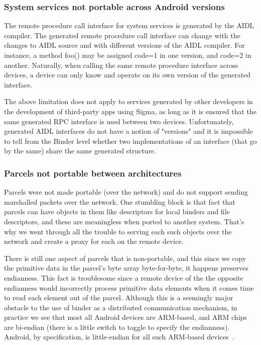 \documentclass[prodmode]{acmlarge}
\begin{document}
\subsubsection{System services not portable across Android versions}
The remote procedure call interface for system services is generated by the AIDL compiler. The generated remote procedure call interface can change with the changes to AIDL source and with different versions of the AIDL compiler. For instance, a method foo() may be assigned code=1 in one version, and code=2 in another. Naturally, when calling the same remote procedure interface across devices, a device can only know and operate on its own version of the generated interface.

The above limitation does not apply to services generated by other developers in the development of third-party apps using Sigma, as long as it is ensured that the same generated RPC interface is used between two devices. Unfortunately, generated AIDL interfaces do not have a notion of "versions" and it is impossible to tell from the Binder level whether two implementations of an interface (that go by the same) share the same generated structure.

\subsubsection{Parcels not portable between architectures}
Parcels were not made portable (over the network) and do not support sending marshalled packets over the network. One stumbling block is that fact that parcels can have objects in them like descriptors for local binders and file descriptors, and these are meaningless when ported to another system. That's why we went through all the trouble to serving each such objects over the network and create a proxy for each on the remote device.

There is still one aspect of parcels that is non-portable, and this since we copy the primitive data in the parcel's byte array byte-for-byte, it happens preserves endianness. This fact is troublesome since a remote device of the the opposite endianness would incorrectly process primitive data elements when it comes time to read each element out of the parcel.
Although this is a seemingly major obstacle to the use of binder as a distributed communication mechanism, in practice we see that most all Android devices are ARM-based, and ARM chips are bi-endian (there is a little switch to toggle to specify the endianness). Android, by specification, is little-endian for all such ARM-based devices~\cite{ARMLittleEndian}.
\end{document}
